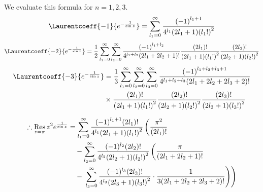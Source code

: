 We evaluate this formula for $n = 1, 2, 3$.
\[
    \Laurentcoeff{-1}{e^{-\inv{\sin z}}}
    = \sum_{l_1 = 0}^\infty \frac{{(-1)}^{l_1 + 1}}{4^{l_1} (2l_1 + 1) {(l_1 !)}^2}
\]
\[
    \Laurentcoeff{-2}{e^{-\inv{\sin z}}}
    = \half \sum_{l_1 = 0}^\infty \sum_{l_2 = 0}^\infty
      \frac{{(-1)}^{l_1 + l_2}}{4^{l_1 + l_2} (2l_1 + 2l_2 + 1)!}
      \frac{(2l_1)!}{(2l_1 + 1) {(l_1 !)}^2} \frac{(2l_2)!}{(2l_2 + 1) {(l_2 !)}^2}
\]
\begin{align*}
    \Laurentcoeff{-3}{e^{-\inv{\sin z}}}
    &= \inv{3} \sum_{l_1 = 0}^\infty \sum_{l_2 = 0}^\infty \sum_{l_3 = 0}^\infty
       \frac{{(-1)}^{l_1 + l_2 + l_3 + 1}}{4^{l_1 + l_2 + l_3} (2l_1 + 2l_2 + 2l_3 + 2)!} \\
    &\times \frac{(2l_1)!}{(2l_1 + 1) {(l_1 !)}^2} \frac{(2l_2)!}{(2l_2 + 1) {(l_2 !)}^2}
            \frac{(2l_3)!}{(2l_3 + 1) {(l_3 !)}^2}
\end{align*}

\[
\begin{split}
    \therefore \mathop{\mathrm{Res}}_{z=\pi}{z^2 e^{\frac{1}{\sin z}}}
    &= \sum_{l_1=0}^\infty \frac{{(-1)}^{l_1 + 1} (2l_1)!}{4^{l_1} (2l_1 + 1) {(l_1 !)}^2} \left(
        \frac{\pi^2}{(2l_1)!}
    \right.\\
    &\quad - \sum_{l_2=0}^\infty \frac{{(-1)^{l_2}} (2l_2)!}{4^{l_2} (2l_2 + 1) {(l_2 !)}^2} \left(
        \frac{\pi}{(2l_1 + 2l_2 + 1)!}
    \right. \\
    &\quad - \left.\left. \sum_{l_3=0}^\infty \frac{{(-1)^{l_3}} (2l_3)!}{4^{l_3} (2l_3 + 1) {(l_3 !)}^2}
       \cdot \frac{1}{3(2l_1 + 2l_2 + 2l_3 + 2)!} \right)\right)
\end{split}
\]

